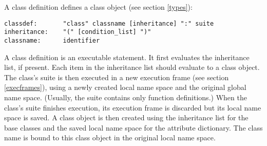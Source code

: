 A class definition defines a class object (see section \ref{types}):

\begin{verbatim}
classdef:       "class" classname [inheritance] ":" suite
inheritance:    "(" [condition_list] ")"
classname:      identifier
\end{verbatim}

A class definition is an executable statement.  It first evaluates the
inheritance list, if present.  Each item in the inheritance list
should evaluate to a class object.  The class's suite is then executed
in a new execution frame (see section \ref{execframes}), using a newly
created local name space and the original global name space.
(Usually, the suite contains only function definitions.)  When the
class's suite finishes execution, its execution frame is discarded but
its local name space is saved.  A class object is then created using
the inheritance list for the base classes and the saved local name
space for the attribute dictionary.  The class name is bound to this
class object in the original local name space.
